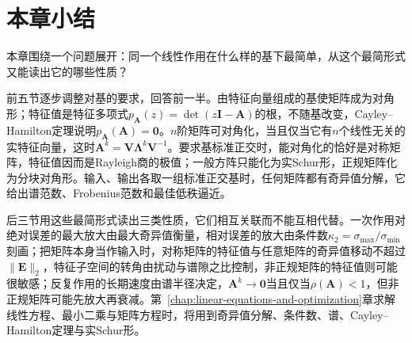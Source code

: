 
\section{本章小结}
\label{sec:ls-analysis-summary}
\label{sec:linear-algebra-summary}
\label{sec:matrix-analysis-summary}

本章围绕一个问题展开：同一个线性作用在什么样的基下最简单，从这个最简形式又能读出它的哪些性质？

前五节逐步调整对基的要求，回答前一半。由特征向量组成的基使矩阵成为对角形；特征值是特征多项式$p_{\bm A}(z)=\det(z\bm I-\bm A)$的根，不随基改变，Cayley--Hamilton定理说明$p_{\bm A}(\bm A)=\bm0$。$n$阶矩阵可对角化，当且仅当它有$n$个线性无关的实特征向量，这时$\bm A^k=\bm V\bm\Lambda^k\bm V^{-1}$。要求基标准正交时，能对角化的恰好是对称矩阵，特征值因而是Rayleigh商的极值；一般方阵只能化为实Schur形，正规矩阵化为分块对角形。输入、输出各取一组标准正交基时，任何矩阵都有奇异值分解，它给出谱范数、Frobenius范数和最佳低秩逼近。

后三节用这些最简形式读出三类性质，它们相互关联而不能互相代替。一次作用对绝对误差的最大放大由最大奇异值衡量，相对误差的放大由条件数$\kappa_2=\sigma_{\max}/\sigma_{\min}$刻画；把矩阵本身当作输入时，对称矩阵的特征值与任意矩阵的奇异值移动不超过$\lVert\bm E\rVert_2$，特征子空间的转角由扰动与谱隙之比控制，非正规矩阵的特征值则可能很敏感；反复作用的长期速度由谱半径决定，$\bm A^k\to\bm0$当且仅当$\rho(\bm A)<1$，但非正规矩阵可能先放大再衰减。第~\ref{chap:linear-equations-and-optimization}章求解线性方程、最小二乘与矩阵方程时，将用到奇异值分解、条件数、谱、Cayley--Hamilton定理与实Schur形。
